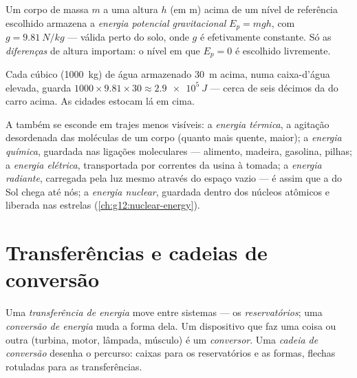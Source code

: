 \begin{definition}\label{def:g10:energy-conservation:potential}
Um corpo de massa $m$ a uma altura $h$ (em \unit{m}) acima de um nível de
referência escolhido armazena a \emph{energia potencial
gravitacional} $E_p = m g h$, com
$g = \qty{9.81}{N/kg}$ --- válida perto do solo, onde $g$ é
efetivamente constante. Só as \emph{diferenças} de altura importam: o
nível em que $E_p = 0$ é escolhido livremente.
\end{definition}

\begin{example}\label{ex:g10:energy-conservation:potential}
Cada  cúbico (\qty{1000}{kg}) de água armazenado \qty{30}{m} acima,
numa caixa-d'água elevada, guarda
$1000 \times 9.81 \times 30 \approx \qty{2.9e5}{J}$ --- cerca de seis
décimos da  do carro acima. As cidades estocam  lá
em cima.
\end{example}

\begin{definition}\label{def:g10:energy-conservation:forms}
A  também se esconde em trajes menos visíveis: a \emph{energia
térmica}, a agitação desordenada das moléculas de
um corpo (quanto mais quente, maior); a \emph{energia
química}, guardada nas ligações moleculares ---
alimento, madeira, gasolina, pilhas; a \emph{energia
elétrica}, transportada por correntes da usina à
tomada; a \emph{energia radiante}, carregada pela
luz mesmo através do espaço vazio --- é assim que a  do Sol chega
até nós; a \emph{energia nuclear}, guardada dentro
dos núcleos atômicos e liberada nas estrelas
(\cref{ch:g12:nuclear-energy}).
\end{definition}

\section{Transferências e cadeias de conversão}

\begin{definition}\label{def:g10:energy-conservation:transfer}
Uma \emph{transferência de energia} move
 entre sistemas --- os \emph{reservatórios}; uma \emph{conversão de energia}
muda a forma dela. Um dispositivo que faz uma coisa ou outra (turbina,
motor, lâmpada, músculo) é um \emph{conversor}. Uma
\emph{cadeia de conversão} desenha o percurso:
caixas para os reservatórios e as formas, flechas rotuladas para as
transferências.
\end{definition}

